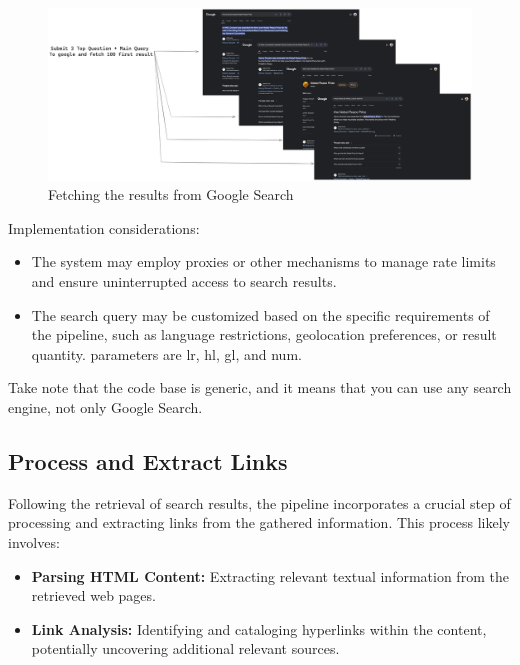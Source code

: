 \begin{figure}[ht!]
    \centering
    \begin{minipage}[b]{\textwidth}
        \centering
        \includegraphics[width=\textwidth]{res/Google-Search-Result}
        \caption{Fetching the results from Google Search}
        \label{fig:google-search-result}
    \end{minipage}
\end{figure}

Implementation considerations:
\begin{itemize}
    \item The system may employ proxies or other mechanisms to manage rate limits and ensure uninterrupted access to search results.
    \item The search query may be customized based on the specific requirements of the pipeline, such as language restrictions, geolocation preferences, or result quantity. parameters are lr, hl, gl, and num.
\end{itemize}

Take note that the code base is generic, and it means that you can use any search engine, not only Google Search.

\subsection{Process and Extract Links}\label{subsec:process-and-extract-links}
Following the retrieval of search results, the pipeline incorporates a crucial step of processing and extracting links from the gathered information.
This process likely involves:
\begin{itemize}
    \item \textbf{Parsing \ac{HTML} Content:} Extracting relevant textual information from the retrieved web pages.
    \item \textbf{Link Analysis:} Identifying and cataloging hyperlinks within the content, potentially uncovering additional relevant sources.
\end{itemize}

